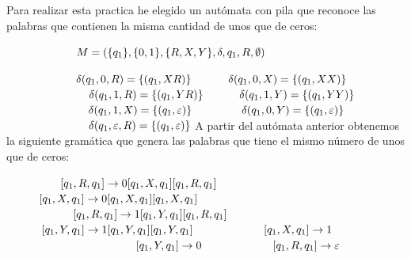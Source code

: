 Para realizar esta practica he elegido un autómata con pila que reconoce las palabras que contienen la misma cantidad de unos que de ceros:
\newline

$\hspace*{2.2cm}M=(\{q_1\},\{0,1\},\{R,X,Y\},\delta,q_1,R,\emptyset)$\newline

$\hspace*{2.2cm}\delta (q_1,0,R) = \{(q_1,XR)\}$                                                       $ \hspace*{1cm}\delta (q_1,0,X) = \{(q_1,XX)\}$\newline
$\hspace*{2.6cm}\delta (q_1,1,R) = \{(q_1,YR)\}$                                                        $ \hspace*{1cm}\delta (q_1,1,Y) = \{(q_1,YY)\}$\newline
$\hspace*{2.6cm}\delta (q_1,1,X) = \{(q_1,\varepsilon )\}$                                     $ \hspace*{1.4cm}\delta (q_1,0,Y) = \{(q_1,\varepsilon )\}$\newline
$\hspace*{2.6cm}\delta (q_1,\varepsilon ,R) = \{(q_1,\varepsilon )\}$\newline
\newline
A partir del autómata anterior obtenemos la siguiente gramática que genera las palabras que tiene el mismo número de unos que de ceros:
\newline

$ \hspace*{1.7cm} [q_1,R,q_1]\rightarrow 0[q_1,X,q_1][q_1,R,q_1] $      $ \hspace*{1.03cm} [q_1,X,q_1]\rightarrow 0[q_1,X,q_1][q_1,X,q_1] $   \newline
$ \hspace*{2.1cm} [q_1,R,q_1]\rightarrow 1[q_1,Y,q_1][q_1,R,q_1] $       $ \hspace*{1.1cm} [q_1,Y,q_1]\rightarrow 1[q_1,Y,q_1][q_1,Y,q_1] $   \newline
$ \hspace*{2.1cm} [q_1,X,q_1]\rightarrow 1 $                                             $ \hspace*{4.1cm} [q_1,Y,q_1]\rightarrow 0$   \newline
$ \hspace*{2.1cm} [q_1,R,q_1]\rightarrow \varepsilon  $   \newline








